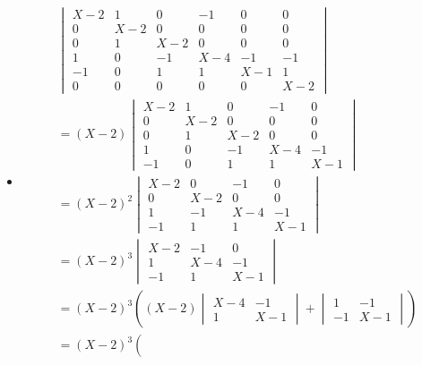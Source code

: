 \documentclass[main.tex]{subfiles}
\begin{document}
\begin{itemize}
   \begin{itemize}
   \item
     \[
     \begin{array}{l}
       \begin{vmatrix}
         X-2 & 1 & 0 & -1 & 0 & 0\\
         0 & X-2 & 0 & 0 & 0 & 0\\
         0 & 1 & X-2 & 0 & 0 & 0\\
         1 & 0 & -1 & X-4 & -1 & -1\\
         -1 & 0 & 1 & 1 & X-1 & 1\\
         0 & 0 & 0 & 0 & 0 & X-2
       \end{vmatrix}\\
       =
       (X-2)
       \begin{vmatrix}
         X-2 & 1 & 0 & -1 & 0\\
         0 & X-2 & 0 & 0 & 0\\
         0 & 1 & X-2 & 0 & 0\\
         1 & 0 & -1 & X-4 & -1\\
         -1 & 0 & 1 & 1 & X-1
       \end{vmatrix}\\
       =
       (X-2)^{2}
       \begin{vmatrix}
         X-2 & 0 & -1 & 0\\
         0 & X-2 & 0 & 0\\
         1 & -1 & X-4 & -1\\
         -1 & 1 & 1 & X-1
       \end{vmatrix}\\
       =
       (X-2)^{3}
       \begin{vmatrix}
         X-2 & -1 & 0\\
         1 & X-4 & -1\\
         -1 & 1 & X-1
       \end{vmatrix}\\
       =
       (X-2)^{3}
       \left(
         (X-2)
         \begin{vmatrix}
           X-4 & -1\\
           1 & X-1
         \end{vmatrix}
         +
         \begin{vmatrix}
           1 & -1\\
           -1 & X-1
         \end{vmatrix}
       \right)\\
       =
       (X-2)^{3}
       \left(

\end{array}\]
\end{itemize}
\end{itemize}
\end{document}
